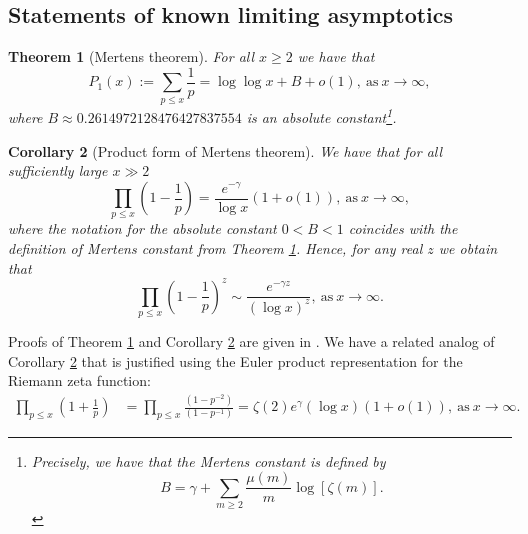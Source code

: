 \documentclass[11pt,reqno,a4letter]{article}
\numberwithin{figure}{section}
\numberwithin{table}{section}
\newcommand{\seqnum}[1]{\href{http://oeis.org/#1}{\color{ProcessBlue}{\underline{#1}}}}
\theoremstyle{plain}
\newtheorem{theorem}{Theorem}
\newtheorem{cor}[theorem]{Corollary}
\numberwithin{theorem}{section}
\theoremstyle{definition}
\begin{document}
\subsection{Statements of known limiting asymptotics} 
\label{subSection_OtherFactsAndResults} 

\begin{theorem}[Mertens theorem]
\label{theorem_Mertens_theorem} 
For all $x \geq 2$ we have that 
\[
P_1(x) := \sum_{p \leq x} \frac{1}{p} = \log\log x + B + o(1), 
     \mathrm{\ as\ } x \rightarrow \infty, 
\]
where 
$B \approx 0.2614972128476427837554$ 
is an absolute constant\footnote{ 
     Precisely, we have that the \emph{Mertens constant} is defined by 
     \cite[\seqnum{A077761}]{OEIS} 
     \[
     B = \gamma + \sum_{m \geq 2} \frac{\mu(m)}{m} \log\left[\zeta(m)\right]. 
     \]
}.
\end{theorem} 

\begin{cor}[Product form of Mertens theorem] 
\label{lemma_Gz_productTermV2} 
We have that for all sufficiently large $x \gg 2$ 
\[
\prod_{p \leq x} \left(1 - \frac{1}{p}\right) = \frac{e^{-\gamma}}{\log x}\left( 
     1 + o(1)\right), \mathrm{\ as\ } x \rightarrow \infty, 
\]
where the notation for the absolute constant $0 < B < 1$ coincides with the definition of 
Mertens constant from Theorem \ref{theorem_Mertens_theorem}. 
Hence, for any real $z$ we obtain that 
\[
\prod_{p \leq x} \left(1 - \frac{1}{p}\right)^{z} \sim 
     \frac{e^{-\gamma z}}{(\log x)^{z}}, \mathrm{\ as\ } x \rightarrow \infty. 
\]
\end{cor} 

Proofs of Theorem \ref{theorem_Mertens_theorem} and 
Corollary \ref{lemma_Gz_productTermV2} are given in 
\cite[\S 22.7; \S 22.8]{HARDYWRIGHT}. 
We have a related analog of Corollary \ref{lemma_Gz_productTermV2} 
that is justified using the Euler product representation for the 
Riemann zeta function: 
\begin{align*} 
\prod_{p \leq x} \left(1 + \frac{1}{p}\right) & = \prod_{p \leq x} 
     \frac{\left(1 - p^{-2}\right)}{\left(1 - p^{-1}\right)} 
     = \zeta(2) e^{\gamma} (\log x) (1 + o(1)), 
     \mathrm{\ as\ } x \rightarrow \infty. 
\end{align*} 
\end{document}
